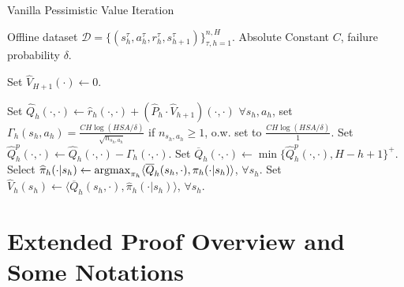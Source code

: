 

 \begin{algorithm}[H]
	\caption{Vanilla Pessimistic Value Iteration}
	\label{alg:VPVI}
	\small{
		\begin{algorithmic}[1]
			 Offline dataset $\mathcal{D}=\{(s_h^\tau,a_h^\tau,r_h^\tau,s_{h+1}^\tau)\}_{\tau,h=1}^{n,H}$. Absolute Constant $C$, failure probability $\delta$.
			
			 Set $\widehat{V}_{H+1}(\cdot)\leftarrow 0$.  
			
			
			\STATE Set $\widehat{Q}_h(\cdot,\cdot)\leftarrow {\widehat{r}_h(\cdot,\cdot)}+(\widehat{P}_{h}\cdot \widehat{V}_{h+1})(\cdot,\cdot)$
			\STATE $\forall s_h,a_h$, set $\Gamma_h(s_h,a_h)=\frac{CH\log(HSA/\delta)}{\sqrt{n_{s_h,a_h}}}$ if $n_{s_h,a_h}\geq 1$, o.w. set to $\frac{CH\log(HSA/\delta)}{1}$.
			\STATE Set $\widehat{Q}^p_h(\cdot,\cdot)\leftarrow \widehat{Q}_h(\cdot,\cdot)-\Gamma_h(\cdot,\cdot)$.
			\STATE Set $\overline{Q}_h(\cdot,\cdot)\leftarrow \min\{\widehat{Q}^p_h(\cdot,\cdot),H-h+1\}^{+}$.
			\STATE Select $\widehat{\pi}_h(\cdot|s_h)\leftarrow \mathop{\mathrm{argmax}}_{\pi_h}\langle \overline{Q}_h(s_h,\cdot),\pi_h(\cdot|s_h)\rangle$, $\forall s_h$.
			\STATE Set $\widehat{V}_h(s_h)\leftarrow\langle \overline{Q}_h(s_h,\cdot), \widehat{\pi}_h(\cdot|s_h) \rangle$,  $\forall s_h$. 
			\ENDFOR
			
			
		\end{algorithmic}
	}
\end{algorithm}

\section{Extended Proof Overview and Some Notations}\label{sec:e_p_o}


